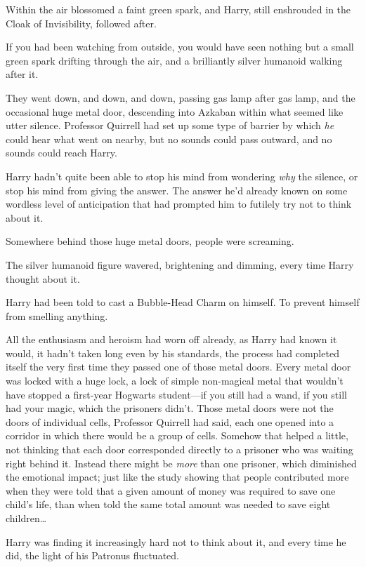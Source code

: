 Within the air blossomed a faint green spark, and Harry, still enshrouded in the Cloak of Invisibility, followed after.

If you had been watching from outside, you would have seen nothing but a small green spark drifting through the air, and a brilliantly silver humanoid walking after it.

\later

They went down, and down, and down, passing gas lamp after gas lamp, and the occasional huge metal door, descending into Azkaban within what seemed like utter silence. Professor Quirrell had set up some type of barrier by which \emph{he} could hear what went on nearby, but no sounds could pass outward, and no sounds could reach Harry.

Harry hadn't quite been able to stop his mind from wondering \emph{why} the silence, or stop his mind from giving the answer. The answer he'd already known on some wordless level of anticipation that had prompted him to futilely try not to think about it.

Somewhere behind those huge metal doors, people were screaming.

The silver humanoid figure wavered, brightening and dimming, every time Harry thought about it.

Harry had been told to cast a Bubble-Head Charm on himself. To prevent himself from smelling anything.

All the enthusiasm and heroism had worn off already, as Harry had known it would, it hadn't taken long even by his standards, the process had completed itself the very first time they passed one of those metal doors. Every metal door was locked with a huge lock, a lock of simple non-magical metal that wouldn't have stopped a first-year Hogwarts student—if you still had a wand, if you still had your magic, which the prisoners didn't. Those metal doors were not the doors of individual cells, Professor Quirrell had said, each one opened into a corridor in which there would be a group of cells. Somehow that helped a little, not thinking that each door corresponded directly to a prisoner who was waiting right behind it. Instead there might be \emph{more} than one prisoner, which diminished the emotional impact; just like the study showing that people contributed more when they were told that a given amount of money was required to save one child's life, than when told the same total amount was needed to save eight children{\ldots}

Harry was finding it increasingly hard not to think about it, and every time he did, the light of his Patronus fluctuated.

